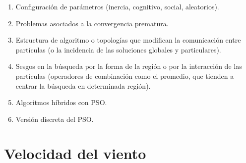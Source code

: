 \begin{enumerate}
    \item  Configuración de parámetros (inercia, cognitivo, social, aleatorios).
    \item  Problemas asociados a la convergencia prematura.
    \item  Estructura de algoritmo o topologías que modifican la comunicación entre partículas (o la incidencia de las soluciones globales y particulares).
    \item  Sesgos en la búsqueda por la forma de la región o por la interacción de las partículas (operadores de combinación como el promedio, que tienden a centrar la búsqueda en determinada región).
    \item  Algoritmos híbridos con PSO.
    \item  Versión discreta del PSO. 
\end{enumerate}  

\section{Velocidad del viento}
